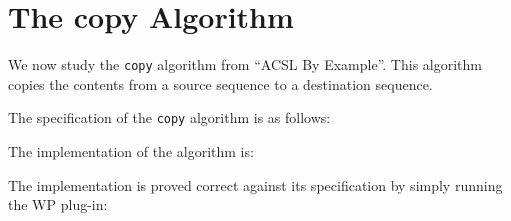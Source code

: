 \clearpage
\section{The \textsf{copy} Algorithm}
\label{copy}

We now study the \texttt{copy} algorithm from ``ACSL By Example''.
This algorithm copies the contents from a source sequence to a destination sequence.

The specification of the \texttt{copy} algorithm is as follows:


The implementation of the algorithm is:


The implementation is proved correct against its specification by
simply running the \textsf{WP} plug-in: 
